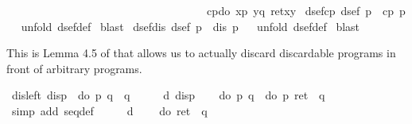 \begin{isabellebody}
\ \ \ \ \ \ \ \ \ \ \ \ \ \ \ \ \ \ \ \ \ \ \ \ \ \ \ \ \ \ \ \ \ \ \ \ cp{\isacharparenleft}do\ {\isacharbraceleft}x{\isasymleftarrow}p{\isacharsemicolon}\ y{\isasymleftarrow}q{\isacharsemicolon}\ ret{\isacharparenleft}x{\isacharcomma}y{\isacharparenright}{\isacharbraceright}{\isacharparenright}{\isacharparenright}{\isachardoublequote}\isanewline
\isanewline
\isanewline
\isamarkupfalse%
\ dsef{\isacharunderscore}cp{\isacharcolon}\ {\isachardoublequote}dsef\ p\ {\isasymLongrightarrow}\ cp\ p{\isachardoublequote}\isanewline
\ \ \isamarkupfalse%
unfold\ dsef{\isacharunderscore}def{\isacharparenright}\isanewline
\isamarkupfalse%
\ blast\isanewline
\isanewline
\isamarkupfalse%
\ dsef{\isacharunderscore}dis{\isacharcolon}\ {\isachardoublequote}dsef\ p\ {\isasymLongrightarrow}\ dis\ p{\isachardoublequote}\isanewline
\ \ \isamarkupfalse%
unfold\ dsef{\isacharunderscore}def{\isacharparenright}\isanewline
\isamarkupfalse%
\ blast\isamarkupfalse%
%
\begin{isamarkuptext}%
This is Lemma 4.5 of \cite{SchroederMossakowski:PDL} that allows us to actually discard
  discardable programs in front of arbitrary programs.%
\end{isamarkuptext}%
\isamarkuptrue%
\ dis{\isacharunderscore}left{\isacharcolon}\ {\isachardoublequote}dis{\isacharparenleft}p{\isacharparenright}\ {\isasymLongrightarrow}\ do\ {\isacharbraceleft}p{\isacharsemicolon}\ q{\isacharbraceright}\ {\isacharequal}\ q{\isachardoublequote}\isanewline
\isamarkupfalse%
\ {\isacharminus}\isanewline
\ \ \isamarkupfalse%
\ d{\isacharcolon}\ {\isachardoublequote}dis{\isacharparenleft}p{\isacharparenright}{\isachardoublequote}\isanewline
\ \ \isamarkupfalse%
\ {\isachardoublequote}do\ {\isacharbraceleft}p{\isacharsemicolon}\ q{\isacharbraceright}\ {\isacharequal}\ do\ {\isacharbraceleft}p{\isacharsemicolon}\ ret\ {\isacharparenleft}{\isacharparenright}{\isacharsemicolon}\ q{\isacharbraceright}{\isachardoublequote}\isanewline
\ \ \ \ \isamarkupfalse%
\ {\isacharparenleft}simp\ add{\isacharcolon}\ seq{\isacharunderscore}def{\isacharparenright}\isanewline
\ \ \isamarkupfalse%
\ \isamarkupfalse%
\ d\ \isamarkupfalse%
\ {\isachardoublequote}{\isasymdots}\ {\isacharequal}\ do\ {\isacharbraceleft}ret\ {\isacharparenleft}{\isacharparenright}{\isacharsemicolon}\ q{\isacharbraceright}{\isachardoublequote}\isanewline

\end{isabellebody}
